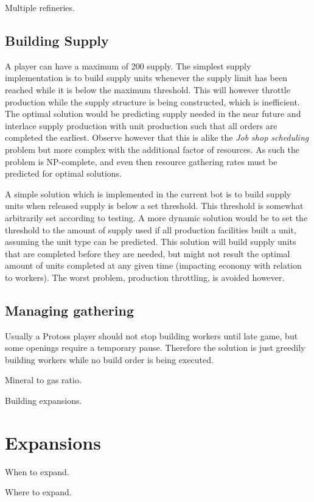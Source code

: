 	Multiple refineries.

	\subsection*{Building Supply}
	A player can have a maximum of 200 supply. The simplest supply implementation is to build supply units whenever the supply limit has been reached while it is below the maximum threshold. This will however throttle production while the supply structure is being constructed, which is inefficient. The optimal solution would be predicting supply needed in the near future and interlace supply production with unit production such that all orders are completed the earliest. Observe however that this is alike the \emph{Job shop scheduling} problem but more complex with the additional factor of resources. As such the problem is NP-complete, and even then resource gathering rates must be predicted for optimal solutions.
	
	A simple solution which is implemented in the current bot is to build supply units when released supply is below a set threshold. This threshold is somewhat arbitrarily set according to testing. A more dynamic solution would be to set the threshold to the amount of supply used if all production facilities built a unit, assuming the unit type can be predicted. This solution will build supply units that are completed before they are needed, but might not result the optimal amount of units completed at any given time (impacting economy with relation to workers). The worst problem, production throttling, is avoided however.

	\subsection*{Managing gathering}
	Usually a Protoss player should not stop building workers until late game, but some openings require a temporary pause. Therefore the solution is just greedily building workers while no build order is being executed.
	
	Mineral to gas ratio.
	
	Building expansions.

\section{Expansions}

When to expand.

Where to expand.

